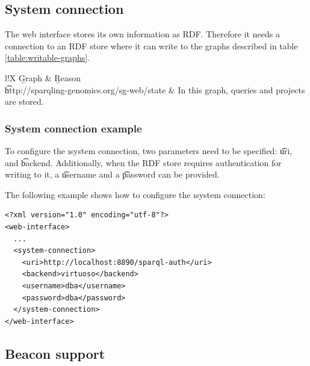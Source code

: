 \subsection{System connection}

  The web interface stores its own information as RDF.  Therefore it needs
  a connection to an RDF store where it can write to the graphs described
  in table \ref{table:writable-graphs}.

  \hypersetup{urlcolor=black}
  \begin{table}[H]
    \begin{tabularx}{\textwidth}{l!{\VRule[-1pt]}X}
      \headrow
      \b{Graph} & \b{Reason}\\
      \evenrow
      \t{http://sparqling-genomics.org/sg-web/state}
      & In this graph, queries and projects are stored.\\
    \end{tabularx}
    \caption{\small Graphs that need to be writable for the web interface.}
    \label{table:writable-graphs}
  \end{table}
  \hypersetup{urlcolor=LinkGray}

\subsubsection{System connection example}

  To configure the \i{system connection}, two parameters need to be
  specified: \t{uri}, and \t{backend}.  Additionally, when the
  RDF store requires authentication for writing to it, a \t{username}
  and a \t{password} can be provided.

  The following example shows how to configure the \i{system connection}:

\begin{siderules}
\begin{verbatim}
<?xml version="1.0" encoding="utf-8"?>
<web-interface>
  ...
  <system-connection>
    <uri>http://localhost:8890/sparql-auth</uri>
    <backend>virtuoso</backend>
    <username>dba</username>
    <password>dba</password>
  </system-connection>
</web-interface>
\end{verbatim}
\end{siderules}

\subsection{Beacon support}
\label{sec:beacon}

